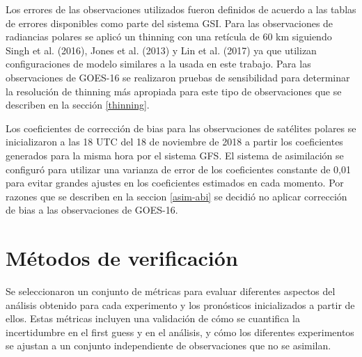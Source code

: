 \documentclass[12pt,oneside,a4paper]{reedthesis}
\begin{document}
Los errores de las observaciones utilizados fueron definidos de acuerdo a las tablas de errores disponibles como parte del sistema GSI. Para las observaciones de radiancias polares se aplicó un thinning con una retícula de 60 km siguiendo Singh et al. (2016), Jones et al. (2013) y Lin et al. (2017) ya que utilizan configuraciones de modelo similares a la usada en este trabajo. Para las observaciones de GOES-16 se realizaron pruebas de sensibilidad para determinar la resolución de thinning más apropiada para este tipo de observaciones que se describen en la sección \ref{thinning}.

Los coeficientes de corrección de bias para las observaciones de satélites polares se inicializaron a las 18 UTC del 18 de noviembre de 2018 a partir los coeficientes generados para la misma hora por el sistema GFS. El sistema de asimilación se configuró para utilizar una varianza de error de los coeficientes constante de 0,01 para evitar grandes ajustes en los coeficientes estimados en cada momento. Por razones que se describen en la seccion \ref{asim-abi} se decidió no aplicar corrección de bias a las observaciones de GOES-16.

\hypertarget{muxe9todos-de-verificaciuxf3n}{%
\section{Métodos de verificación}\label{muxe9todos-de-verificaciuxf3n}}

Se seleccionaron un conjunto de métricas para evaluar diferentes aspectos del análisis obtenido para cada experimento y los pronósticos inicializados a partir de ellos. Estas métricas incluyen una validación de cómo se cuantifica la incertidumbre en el first guess y en el análisis, y cómo los diferentes experimentos se ajustan a un conjunto independiente de observaciones que no se asimilan.
\end{document}

